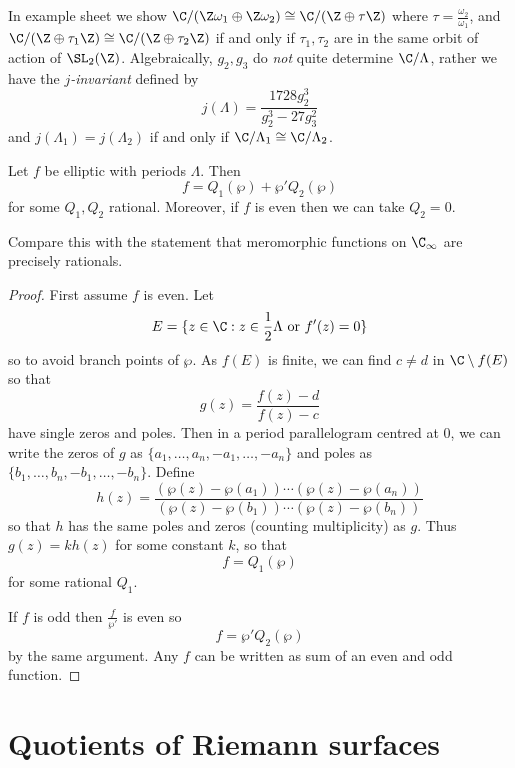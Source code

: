 \documentclass[a4paper]{article}
\begin{document}
\begin{remark}
  In example sheet we show \(\C/(\Z\omega_1 \oplus \Z\omega_2) \cong \C/(\Z \oplus \tau \Z)\) where \(\tau = \frac{\omega_2}{\omega_1}\), and \(\C/(\Z \oplus \tau_1\Z) \cong \C/(\Z \oplus \tau_2\Z)\) if and only if \(\tau_1, \tau_2\) are in the same orbit of action of \(\SL_2(\Z)\). Algebraically, \(g_2, g_3\) do \emph{not} quite determine \(\C/\Lambda\), rather we have the \emph{\(j\)-invariant} defined by
  \[
    j(\Lambda) = \frac{1728g_2^3}{g_2^3 - 27 g_3^2}
  \]
  and \(j(\Lambda_1) = j(\Lambda_2)\) if and only if \(\C/\Lambda_1 \cong \C/\Lambda_2\).
\end{remark}

\begin{theorem}
  Let \(f\) be elliptic with periods \(\Lambda\). Then
  \[
    f = Q_1(\wp) + \wp' Q_2(\wp)
  \]
  for some \(Q_1, Q_2\) rational. Moreover, if \(f\) is even then we can take \(Q_2 = 0\).
\end{theorem}

Compare this with the statement that meromorphic functions on \(\C_\infty\) are precisely rationals.

\begin{proof}
  First assume \(f\) is even. Let
  \[
    E = \{z \in \C: z \in \frac{1}{2} \Lambda \text{ or } f'(z) = 0\}
  \]
  so to avoid branch points of \(\wp\). As \(f(E)\) is finite, we can find \(c \neq d\) in \(\C \setminus f(E)\) so that
  \[
    g(z) = \frac{f(z) - d}{f(z) - c}
  \]
  have single zeros and poles. Then in a period parallelogram centred at \(0\), we can write the zeros of \(g\) as \(\{a_1, \dots, a_n, -a_1, \dots, -a_n\}\) and poles as \(\{b_1, \dots, b_n, -b_1, \dots, -b_n\}\). Define
  \[
    h(z) = \frac{(\wp(z) - \wp(a_1)) \cdots (\wp(z) - \wp(a_n))}{(\wp(z) - \wp(b_1)) \cdots (\wp(z) - \wp(b_n))}
  \]
  so that \(h\) has the same poles and zeros (counting multiplicity) as \(g\). Thus \(g(z) = kh(z)\) for some constant \(k\), so that
  \[
    f = Q_1(\wp)
  \]
  for some rational \(Q_1\).

  If \(f\) is odd then \(\frac{f}{\wp'}\) is even so
  \[
    f = \wp' Q_2(\wp)
  \]
  by the same argument. Any \(f\) can be written as sum of an even and odd function.
\end{proof}

\section{Quotients of Riemann surfaces}
\end{document}
